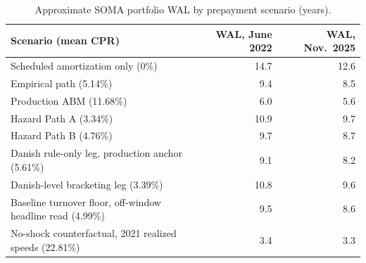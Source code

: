 \documentclass[12pt]{article}
\begin{document}
\begin{table}[H]
\centering
\small
\begin{threeparttable}
\caption{Approximate SOMA portfolio WAL by prepayment scenario (years).}
\label{tab:wal}
\begin{tabular}{@{}lrr@{}}
\toprule
Scenario (mean CPR) & WAL, June 2022 & WAL, Nov.\ 2025 \\
\midrule
Scheduled amortization only (0\%) & 14.7 & 12.6 \\
Empirical path (5.14\%) & 9.4 & 8.5 \\
Production ABM (11.68\%) & 6.0 & 5.6 \\
Hazard Path A (3.34\%) & 10.9 & 9.7 \\
Hazard Path B (4.76\%) & 9.7 & 8.7 \\
Danish rule-only leg, production anchor (5.61\%) & 9.1 & 8.2 \\
Danish-level bracketing leg (3.39\%) & 10.8 & 9.6 \\
Baseline turnover floor, off-window headline read (4.99\%) & 9.5 & 8.6 \\
No-shock counterfactual, 2021 realized speeds (22.81\%) & 3.4 & 3.3 \\
\bottomrule
\end{tabular}
\begin{tablenotes}[flushleft]\footnotesize

\end{tablenotes}
\end{threeparttable}
\end{table}
\end{document}
